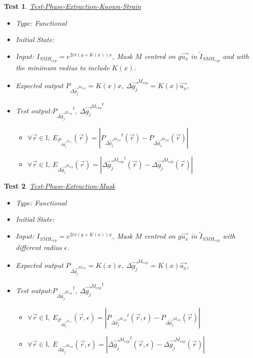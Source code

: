 \documentclass[12pt, titlepage]{article}
\newtheorem{Test}{Test}
\begin{document}
\begin{Test}\normalfont\underline{Test-Phase-Extraction-Known-Strain}
\begin{itemize}
\item Type: Functional
\item Initial State:
\item Input: $I_{SMH_{exp}}=e^{2i\pi (g+K(x))x}$, Mask $M$ centred on $g\overrightarrow{u_x}$ in $\widetilde{I}_{SMH_{exp}}$ and with the minimum radius to include $K(x)$. 
\item Expected output $P_{\Delta \overrightarrow{g_{j}}^{M_{exp}}}=K(x)x$, $\Delta \overrightarrow{g_{j}}^{M_{exp}}=K(x)\overrightarrow{u_x}$, 
\item Test output:${P_{\Delta \overrightarrow{g_{j}}^{M_{exp}}}}^{t}$, $\Delta {\overrightarrow{g_{j}}^{M_{exp}}}^{t}$
	\begin{itemize}
	\item $\forall \vec{r} \in \mathbb{I}, \ E_{P_{\Delta \overrightarrow{g_{j}}^{M_{exp}}}}(\vec{r})=|{P_{\Delta \overrightarrow{g_{j}}^{M_{exp}}}}^{t}(\vec{r})-P_{\Delta \overrightarrow{g_{j}}^{M_{exp}}}(\vec{r})|$
	\item $\forall \vec{r} \in \mathbb{I}, \ E_{\Delta {\overrightarrow{g_{j}}^{M_{exp}}}}(\vec{r})=|{\Delta {\overrightarrow{g_{j}}^{M_{exp}}}}^t(\vec{r})-{\Delta {\overrightarrow{g_{j}}^{M_{exp}}}}(\vec{r})|$
	\end{itemize}  
\end{itemize}
\end{Test}				
 
\begin{Test}\normalfont\underline{Test-Phase-Extraction-Mask}
\begin{itemize}
\item Type: Functional
\item Initial State:
\item Input: $I_{SMH_{exp}}=e^{2i\pi (g+K(x))x}$, Mask $M$ centred on $g\overrightarrow{u_x}$ in $\widetilde{I}_{SMH_{exp}}$ with different radius $\epsilon$. 
\item Expected output $P_{\Delta \overrightarrow{g_{j}}^{M_{exp}}}=K(x)x$, $\Delta \overrightarrow{g_{j}}^{M_{exp}}=K(x)\overrightarrow{u_x}$, 
\item Test output:${P_{\Delta \overrightarrow{g_{j}}^{M_{exp}}}}^{t}$, $\Delta {\overrightarrow{g_{j}}^{M_{exp}}}^{t}$
	\begin{itemize}
	\item $\forall \vec{r} \in \mathbb{I}, \ E_{P_{\Delta \overrightarrow{g_{j}}^{M_{exp}}}}(\vec{r},\epsilon)=|{P_{\Delta \overrightarrow{g_{j}}^{M_{exp}}}}^{t}(\vec{r},\epsilon)-P_{\Delta \overrightarrow{g_{j}}^{M_{exp}}}(\vec{r})|$
	\item $\forall \vec{r} \in \mathbb{I}, \ E_{\Delta {\overrightarrow{g_{j}}^{M_{exp}}}}(\vec{r},\epsilon)=|{\Delta {\overrightarrow{g_{j}}^{M_{exp}}}}^t(\vec{r},\epsilon)-{\Delta {\overrightarrow{g_{j}}^{M_{exp}}}}(\vec{r})|$
	\end{itemize}
\end{itemize}
\end{Test}						
\end{document}
